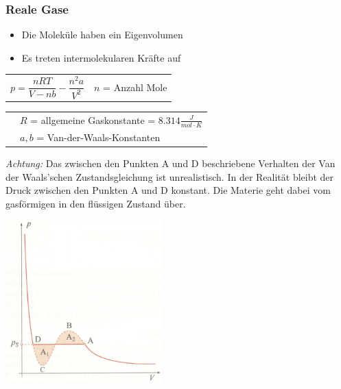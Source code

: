 	\subsubsection{Reale Gase}
		\begin{minipage}{15cm}
			\begin{itemize}
				\item Die Moleküle haben ein Eigenvolumen
				\item Es treten intermolekularen Kräfte auf
			\end{itemize}
		\end{minipage}
		\newline
		\newline
		\newline
		\newline
		\begin{minipage}{12.5cm}
				\newline
				\renewcommand{\arraystretch}{2.5}
				\begin{tabular}{ p{4cm} | p{7cm}}
					$p = \dfrac{nRT}{V-nb} - \dfrac{n^2 a}{V^2}$	&	$n$ = Anzahl Mole\\
				\end{tabular}
				\renewcommand{\arraystretch}{1.5}
				\begin{tabular}{ p{4cm} | p{7cm} }
					& $R$ = allgemeine Gaskonstante = $8.314 \frac{J}{mol \cdot K}$\\
					& $a, b$ = Van-der-Waals-Konstanten\\
				\end{tabular} 
				\renewcommand{\arraystretch}{1}
				\newline
				\newline
				\newline
				\textit{Achtung:} Das zwischen den Punkten A und D beschriebene Verhalten der Van der Waals'schen Zustandsgleichung ist unrealistisch. In der Realität bleibt der Druck zwischen den Punkten A und D konstant. Die Materie geht dabei vom gasförmigen in den flüssigen Zustand über.
		\end{minipage}
		\begin{minipage}{10cm}
			\vspace{-\ht\strutbox}\includegraphics[width=6cm]{./bilder/VanDerWaalsscheZustandsfunktion.png}
		\end{minipage}
	\newpage
